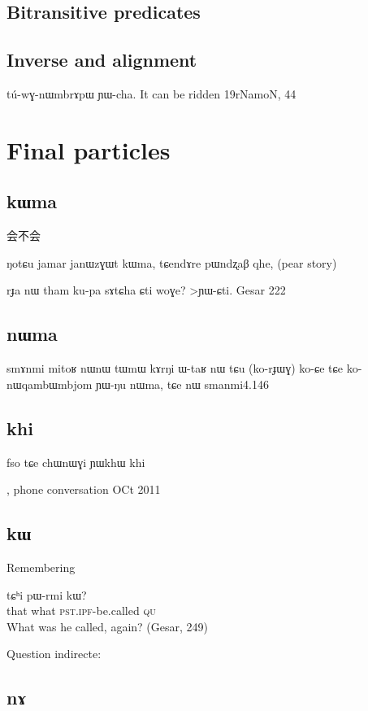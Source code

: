 \documentclass[oldfontcommands,oneside,a4paper,11pt]{memoir}
\newcommand{\ipa}[1]{{\phon #1}} %
\newcommand{\wav}[1]{}%
\newcommand{\ipf}{\textsc{ipf}}
\newcommand{\pst}{\textsc{pst}}
\begin{document}
\section{Bitransitive predicates} \label{sec:bitransitive}


\section{Inverse and alignment}  

tú-wɣ-nɯmbrɤpɯ ɲɯ-cha.
It can be ridden
19rNamoN, 44
\chapter{Final particles}


\section{kɯma}
会不会


ŋotɕu jamar janɯzɣɯt kɯma, tɕendɤre pɯndʐaβ qhe, (pear story)


rɟa	nɯ	tham	ku-pa	sɤtɕha	ɕti	woɣe?
>ɲɯ-ɕti.
Gesar 222

\section{nɯma}
smɤnmi mitoʁ nɯnɯ tɯmɯ kɤrŋi ɯ-taʁ nɯ tɕu (ko-rɟɯɣ) ko-ɕe
tɕe ko-nɯqambɯmbjom ɲɯ-ŋu nɯma, tɕe nɯ 
smanmi4.146
\section{khi}

fso tɕe chɯnɯɣi ɲɯkhɯ khi

\wav{8_chWnWGi}, phone conversation OCt 2011


\section{kɯ}

Remembering
 \begin{exe}
\ex
\gll    \ipa{nɯnɯ} 	\ipa{tɕʰi} 	\ipa{pɯ-rmi} 	\ipa{kɯ?}       \\
that what \pst{}.\ipf{}-be.called \textsc{qu} \\
\glt  What was he called, again? (Gesar, 249)
\end{exe} 
 
 
 Question indirecte:

\section{nɤ}
\end{document}
